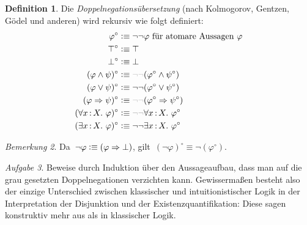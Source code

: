 \documentclass[a4paper,ngerman,12pt]{scrartcl}
\theoremstyle{definition}
\newtheorem{defn}{Definition}[section]
\theoremstyle{plain}
\theoremstyle{remark}
\newtheorem{bem}[defn]{Bemerkung}
\newtheorem{aufg}[defn]{Aufgabe}
\renewcommand{\_}{\mathpunct{.}\,}
\newcommand{\?}{\,{:}\,}
\newcommand{\defequiv}{\vcentcolon\equiv}
\begin{document}
\begin{defn}Die \emph{Doppelnegationsübersetzung} (nach Kolmogorov, Gentzen,
Gödel und anderen) wird rekursiv wie folgt definiert:
\newcommand{\optnegneg}{\textcolor{grey}{\neg\neg}}
\begin{align*}
  \varphi^\circ &\defequiv \neg\neg \varphi \text{ für atomare Aussagen~$\varphi$} \\
  \top^\circ &\defequiv \top \\
  \bot^\circ &\defequiv \bot \\
  (\varphi \wedge \psi)^\circ &\defequiv \optnegneg(\varphi^\circ \wedge \psi^\circ) \\
  (\varphi \vee \psi)^\circ &\defequiv \neg\neg(\varphi^\circ \vee \psi^\circ) \\
  (\varphi \Rightarrow \psi)^\circ &\defequiv \optnegneg(\varphi^\circ \Rightarrow \psi^\circ) \\
  (\forall x\?X\_ \varphi)^\circ &\defequiv \optnegneg\forall x\?X\_ \varphi^\circ \\
  (\exists x\?X\_ \varphi)^\circ &\defequiv \neg\neg\exists x\?X\_ \varphi^\circ
\end{align*}
\end{defn}

\begin{bem}Da~$\neg\varphi \defequiv (\varphi \Rightarrow \bot)$,
gilt~$(\neg\varphi)^\circ \equiv \neg(\varphi^\circ)$.\end{bem}

\begin{aufg}Beweise durch Induktion über den Aussageaufbau, dass man auf die grau
gesetzten Doppelnegationen verzichten kann. Gewissermaßen besteht also der
einzige Unterschied zwischen klassischer und intuitionistischer Logik in der
Interpretation der Disjunktion und der Existenzquantifikation: Diese sagen
konstruktiv mehr aus als in klassischer Logik.\end{aufg}
\end{document}
